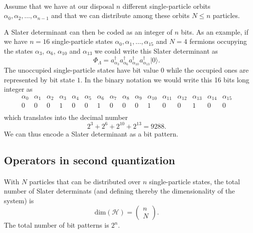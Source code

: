\documentclass[%
twoside,                 %
final,                   %
10pt]{article}
\begin{document}
\paragraph{}
Assume that we have at our disposal $n$ different single-particle orbits
$\alpha_0,\alpha_2,\dots,\alpha_{n-1}$ and that we can distribute  among these orbits $N\le n$ particles.

A Slater  determinant can then be coded as an integer of $n$ bits. As an example, if we have $n=16$ single-particle states
$\alpha_0,\alpha_1,\dots,\alpha_{15}$ and $N=4$ fermions occupying the states $\alpha_3$, $\alpha_6$, $\alpha_{10}$ and $\alpha_{13}$
we could write this Slater determinant as  
\[
\Phi_{\Lambda} = a_{\alpha_3}^{\dagger} a_{\alpha_6}^{\dagger} a_{\alpha_{10}}^{\dagger} a_{\alpha_{13}}^{\dagger} |0\rangle.
\]
The unoccupied single-particle states have bit value $0$ while the occupied ones are represented by bit state $1$. 
In the binary notation we would write this   16 bits long integer as
\[
\begin{array}{cccccccccccccccc}
{\alpha_0}&{\alpha_1}&{\alpha_2}&{\alpha_3}&{\alpha_4}&{\alpha_5}&{\alpha_6}&{\alpha_7} & {\alpha_8} &{\alpha_9} & {\alpha_{10}} &{\alpha_{11}} &{\alpha_{12}} &{\alpha_{13}} &{\alpha_{14}} & {\alpha_{15}} \\
{0} & {0} &{0} &{1} &{0} &{0} &{1} &{0} &{0} &{0} &{1} &{0} &{0} &{1} &{0} & {0} \\
\end{array}
\]
which translates into the decimal number
\[
2^3+2^6+2^{10}+2^{13}=9288.
\]
We can thus encode a Slater determinant as a bit pattern.




\subsection*{Operators in second quantization}

\paragraph{}
With $N$ particles that can be distributed over $n$ single-particle states, the total number of Slater determinats (and defining thereby the dimensionality of the system) is
\[
\mathrm{dim}(\mathcal{H}) = \left(\begin{array}{c} n \\N\end{array}\right).
\]
The total number of bit patterns is $2^n$.
\end{document}
